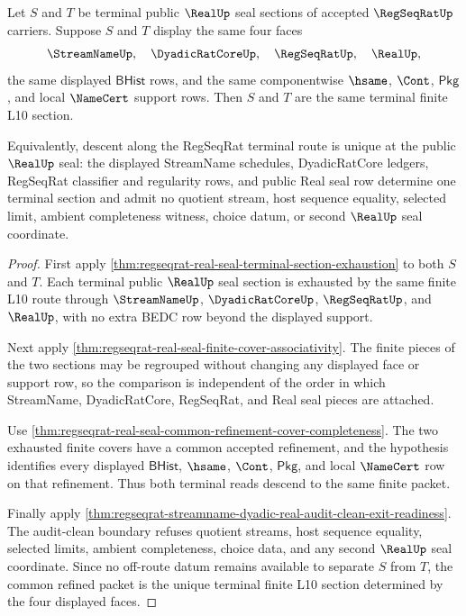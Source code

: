 \begin{theorem}
\label{thm:regseqrat-terminal-descent-uniqueness}
Let $S$ and $T$ be terminal public $\RealUp$ seal sections of accepted
$\RegSeqRatUp$ carriers. Suppose $S$ and $T$ display the same four faces
$$
\StreamNameUp,\quad \DyadicRatCoreUp,\quad \RegSeqRatUp,\quad \RealUp,
$$
the same displayed $\mathsf{BHist}$ rows, and the same componentwise
$\hsame$, $\Cont$, $\mathsf{Pkg}$, and local $\NameCert$ support rows. Then
$S$ and $T$ are the same terminal finite L10 section.

Equivalently, descent along the RegSeqRat terminal route is unique at the
public $\RealUp$ seal: the displayed StreamName schedules, DyadicRatCore
ledgers, RegSeqRat classifier and regularity rows, and public Real seal row
determine one terminal section and admit no quotient stream, host sequence
equality, selected limit, ambient completeness witness, choice datum, or
second $\RealUp$ seal coordinate.
\end{theorem}
\begin{proof}
First apply
\autoref{thm:regseqrat-real-seal-terminal-section-exhaustion} to both
$S$ and $T$. Each terminal public $\RealUp$ seal section is exhausted by the
same finite L10 route through $\StreamNameUp$, $\DyadicRatCoreUp$,
$\RegSeqRatUp$, and $\RealUp$, with no extra BEDC row beyond the displayed
support.

Next apply
\autoref{thm:regseqrat-real-seal-finite-cover-associativity}. The finite
pieces of the two sections may be regrouped without changing any displayed
face or support row, so the comparison is independent of the order in which
StreamName, DyadicRatCore, RegSeqRat, and Real seal pieces are attached.

Use
\autoref{thm:regseqrat-real-seal-common-refinement-cover-completeness}. The
two exhausted finite covers have a common accepted refinement, and the
hypothesis identifies every displayed $\mathsf{BHist}$, $\hsame$, $\Cont$,
$\mathsf{Pkg}$, and local $\NameCert$ row on that refinement. Thus both
terminal reads descend to the same finite packet.

Finally apply
\autoref{thm:regseqrat-streamname-dyadic-real-audit-clean-exit-readiness}.
The audit-clean boundary refuses quotient streams, host sequence equality,
selected limits, ambient completeness, choice data, and any second $\RealUp$
seal coordinate. Since no off-route datum remains available to separate
$S$ from $T$, the common refined packet is the unique terminal finite L10
section determined by the four displayed faces.
\end{proof}

